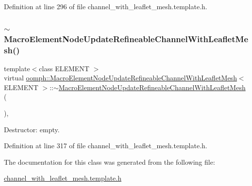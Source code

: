 Definition at line 296 of file channel\+\_\+with\+\_\+leaflet\+\_\+mesh.\+template.\+h.

\mbox{\label{classoomph_1_1MacroElementNodeUpdateRefineableChannelWithLeafletMesh_af22b4288c7db553beb8658c29eb2cdaf}} 
\subsubsection{\texorpdfstring{$\sim$\+Macro\+Element\+Node\+Update\+Refineable\+Channel\+With\+Leaflet\+Mesh()}{~MacroElementNodeUpdateRefineableChannelWithLeafletMesh()}}
{\footnotesize\ttfamily template$<$class E\+L\+E\+M\+E\+NT $>$ \\
virtual \hyperlink{classoomph_1_1MacroElementNodeUpdateRefineableChannelWithLeafletMesh}{oomph\+::\+Macro\+Element\+Node\+Update\+Refineable\+Channel\+With\+Leaflet\+Mesh}$<$ E\+L\+E\+M\+E\+NT $>$\+::$\sim$\hyperlink{classoomph_1_1MacroElementNodeUpdateRefineableChannelWithLeafletMesh}{Macro\+Element\+Node\+Update\+Refineable\+Channel\+With\+Leaflet\+Mesh} (\begin{DoxyParamCaption}{ }\end{DoxyParamCaption})\hspace{0.3cm}{\ttfamily [inline]}, {\ttfamily [virtual]}}



Destructor\+: empty. 



Definition at line 317 of file channel\+\_\+with\+\_\+leaflet\+\_\+mesh.\+template.\+h.



The documentation for this class was generated from the following file\+:\begin{DoxyCompactItemize}
\item 
\hyperlink{channel__with__leaflet__mesh_8template_8h}{channel\+\_\+with\+\_\+leaflet\+\_\+mesh.\+template.\+h}\end{DoxyCompactItemize}
